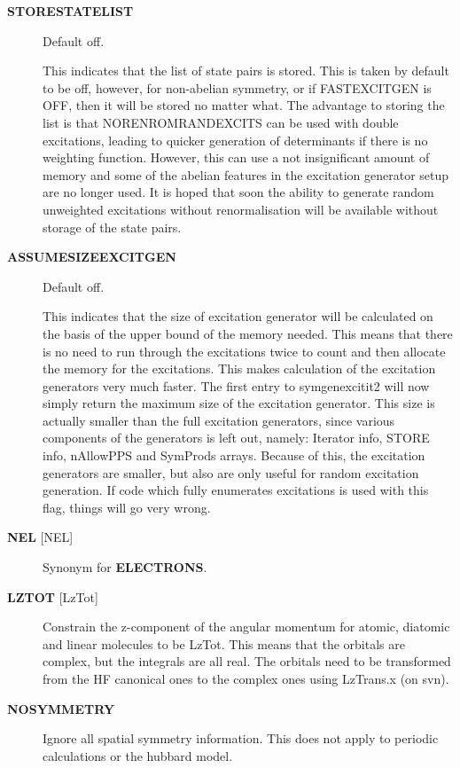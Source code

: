 \documentclass[openany,a4paper,10pt,english]{manual}
\begin{document}
\begin{description}
\item[\textbf{STORESTATELIST}] \leavevmode
Default off.

This indicates that the list of state pairs is stored. This is taken by default to be off, however, for
non-abelian symmetry, or if FASTEXCITGEN is OFF, then it will be stored no matter what. The advantage to
storing the list is that NORENROMRANDEXCITS can be used with double excitations, leading to quicker
generation of determinants if there is no weighting function. However, this can use a not insignificant
amount of memory and some of the abelian features in the excitation generator setup are no longer used.
It is hoped that soon the ability to generate random unweighted excitations without renormalisation will
be available without storage of the state pairs.

\item[\textbf{ASSUMESIZEEXCITGEN}] \leavevmode
Default off.

This indicates that the size of excitation generator will be calculated on the basis of the upper bound of the memory
needed. This means that there is no need to run through the excitations twice to count and then allocate the memory
for the excitations. This makes calculation of the excitation generators very much faster. The first entry to
symgenexcitit2 will now simply return the maximum size of the excitation
generator. This size is actually smaller than the full excitation generators, since various components of the
generators is left out, namely: Iterator info, STORE info, nAllowPPS and SymProds arrays. Because of this, the
excitation generators are smaller, but also are only useful for random excitation generation. If code which fully
enumerates excitations is used with this flag, things will go very wrong.

\item[\textbf{NEL} {[}NEL{]}] \leavevmode
Synonym for \textbf{ELECTRONS}.

\item[\textbf{LZTOT} {[}LzTot{]}] \leavevmode
Constrain the z-component of the angular momentum for atomic, diatomic and linear molecules to be LzTot. This means
that the orbitals are complex, but the integrals are all real. The orbitals need to be transformed from the HF canonical
ones to the complex ones using LzTrans.x (on svn).

\item[\textbf{NOSYMMETRY}] \leavevmode
Ignore all spatial symmetry information. This does not apply to
periodic calculations or the hubbard model.


\end{description}
\end{document}
